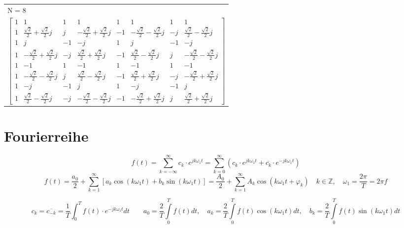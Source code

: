 		\begin{tabular}{l }
        N = 8\\
 		$\begin{bmatrix}
		1 & 1 & 1 & 1 & 1 & 1 & 1 & 1\\ 
		1 & \frac{\sqrt{2}}{2}+\frac{\sqrt{2}}{2}j & j &
		-\frac{\sqrt{2}}{2}+\frac{\sqrt{2}}{2}j & -1 & 
		-\frac{\sqrt{2}}{2}-\frac{\sqrt{2}}{2}j & -j & 
		\frac{\sqrt{2}}{2}-\frac{\sqrt{2}}{2}j\\
		1 & j & -1 & -j & 1 & j & -1 & -j\\
		1 &	-\frac{\sqrt{2}}{2}+\frac{\sqrt{2}}{2}j & -j & 
		\frac{\sqrt{2}}{2}+\frac{\sqrt{2}}{2}j & -1 & 
		\frac{\sqrt{2}}{2}-\frac{\sqrt{2}}{2}j & j &
		-\frac{\sqrt{2}}{2}-\frac{\sqrt{2}}{2}j\\
		1 & -1 & 1 & -1 & 1 & -1 & 1 & -1\\
		1 &	-\frac{\sqrt{2}}{2}-\frac{\sqrt{2}}{2}j & j &
		\frac{\sqrt{2}}{2}-\frac{\sqrt{2}}{2}j & -1 &
		\frac{\sqrt{2}}{2}+\frac{\sqrt{2}}{2}j & -j &
		-\frac{\sqrt{2}}{2}+\frac{\sqrt{2}}{2}j\\
		1 & -j & -1 & j & 1 & -j & -1 & j\\
		1 &	\frac{\sqrt{2}}{2}-\frac{\sqrt{2}}{2}j & -j & 
		-\frac{\sqrt{2}}{2}-\frac{\sqrt{2}}{2}j & -1 &
		-\frac{\sqrt{2}}{2}+\frac{\sqrt{2}}{2}j & j &
		\frac{\sqrt{2}}{2}+\frac{\sqrt{2}}{2}j
		\end{bmatrix}$
		\end{tabular}


	
	
	
	\section{Fourierreihe}
  	$$\boxed{f(t) = \sum\limits_{k = -\infty}^{\infty} c_k \cdot e^{j k \omega_1
  	t}}= \boxed{\sum\limits_{k = 0}^{\infty} \left(c_k \cdot e^{j k \omega_1
  	t} + \overline{c_k} \cdot e^{-j k \omega_1t}\right)}$$
  	$$\boxed{f(t) = \frac{a_0}{2} + \sum\limits_{k=1}^{\infty} \left[a_k \cos(k
  	\omega_1 t) + b_k \sin(k \omega_1 t)\right]}=\boxed{\frac{A_0}{2} +
  	\sum\limits_{k=1}^{\infty} A_k \cos(k \omega_1 t + \varphi_k)} \quad k\in
  	\mathbb{Z}, \quad \omega_1=\frac{2 \pi}{T}=2 \pi f$$	
	
	$$\boxed{c_k=\overline{c_{-k}}=\frac{1}{T}\int_0^T{f(t)\cdot
	e^{-jk\omega_1
	t}dt}} \qquad \boxed{a_0 = \frac{2}{T}\int\limits_0^{T} f(t)dt, \quad a_k =
	\frac{2}{T}\int\limits_0^{T} f(t)\cos(k \omega_1 t) dt, \quad b_k =
	\frac{2}{T}\int\limits_0^{T} f(t)\sin(k \omega_1 t) dt}$$

